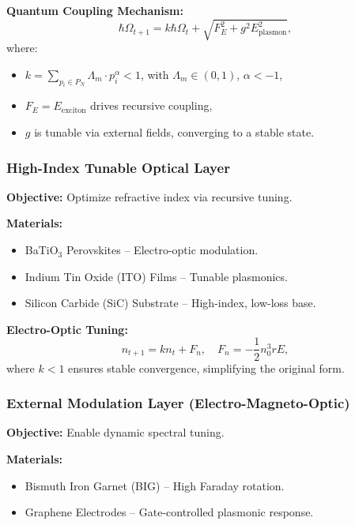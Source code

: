 \documentclass{article}
\theoremstyle{plain}
\begin{document}
\textbf{Quantum Coupling Mechanism:}
\begin{equation}
    \hbar \Omega_{t+1} = k \hbar \Omega_t + \sqrt{F_E^2 + g^2 E_{\text{plasmon}}^2},
\end{equation}
where:
\begin{itemize}
    \item \( k = \sum_{p_i \in P_N} \Lambda_m \cdot p_i^\alpha < 1 \), with \( \Lambda_m \in (0, 1) \), \( \alpha < -1 \),
    \item \( F_E = E_{\text{exciton}} \) drives recursive coupling,
    \item \( g \) is tunable via external fields, converging to a stable state.
\end{itemize}

\subsubsection{High-Index Tunable Optical Layer}
\textbf{Objective:} Optimize refractive index via recursive tuning.

\textbf{Materials:}
\begin{itemize}
    \item BaTiO$_3$ Perovskites – Electro-optic modulation.
    \item Indium Tin Oxide (ITO) Films – Tunable plasmonics.
    \item Silicon Carbide (SiC) Substrate – High-index, low-loss base.
\end{itemize}

\textbf{Electro-Optic Tuning:}
\begin{equation}
    n_{t+1} = k n_t + F_n, \quad F_n = -\frac{1}{2} n_0^3 r E,
\end{equation}
where \( k < 1 \) ensures stable convergence, simplifying the original form.

\subsubsection{External Modulation Layer (Electro-Magneto-Optic)}
\textbf{Objective:} Enable dynamic spectral tuning.

\textbf{Materials:}
\begin{itemize}
    \item Bismuth Iron Garnet (BIG) – High Faraday rotation.
    \item Graphene Electrodes – Gate-controlled plasmonic response.
\end{itemize}
\end{document}
